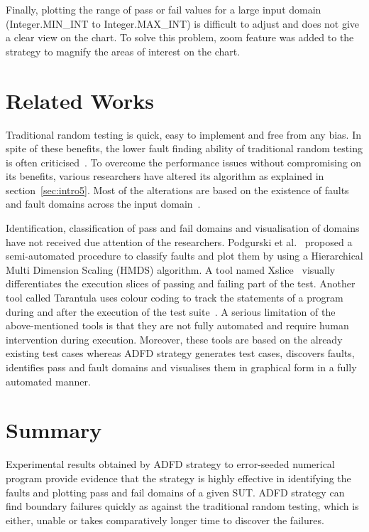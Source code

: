 Finally, plotting the range of pass or fail values for a large input domain (Integer.MIN\_INT to Integer.MAX\_INT) is difficult to adjust and does not give a clear view on the chart. To solve this problem, zoom feature was added to the strategy to magnify the areas of interest on the chart.



\section{Related Works} \label{sec:relatedWork}
Traditional random testing is quick, easy to implement and free from any bias. In spite of these benefits, the lower fault finding ability of traditional random testing is often criticised~\cite{myers2011art, offutt1996semantic}. To overcome the performance issues without compromising on its benefits, various researchers have altered its algorithm as explained in section~\ref{sec:intro5}. Most of the alterations are based on the existence of faults and fault domains across the input domain~\cite{chan1996proportional}. 

Identification, classification of pass and fail domains and visualisation of domains have not received due attention of the researchers. Podgurski et al.~\cite{podgurski2003automated} proposed a semi-automated procedure to classify faults and plot them by using a Hierarchical Multi Dimension Scaling (HMDS) algorithm. A tool named Xslice~\cite{agrawal1995fault} visually differentiates the execution slices of passing and failing part of the test. Another tool called Tarantula uses colour coding to track the statements of a program during and after the execution of the test suite~\cite{jones2002visualization}. A serious limitation of the above-mentioned tools is that they are not fully automated and require human intervention during execution. Moreover, these tools are based on the already existing test cases whereas ADFD strategy generates test cases, discovers faults, identifies pass and fault domains and visualises them in graphical form in a fully automated manner. 


\section{Summary} \label{sec:conclusion}
Experimental results obtained by ADFD strategy to error-seeded numerical program provide evidence that the strategy is highly effective in identifying the faults and plotting pass and fail domains of a given SUT. ADFD strategy can find boundary failures quickly as against the traditional random testing, which is either, unable or takes comparatively longer time to discover the failures.

